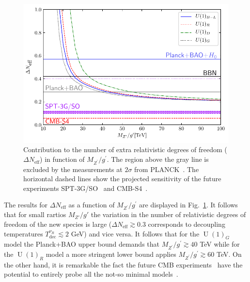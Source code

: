 \documentclass[12pt]{article}
\begin{document}
%
\begin{figure}[t]
\centering
\includegraphics[scale=1]{D_Neff.pdf}
\caption{Contribution to the number of extra relativistic degrees of freedom ($\Delta N_{\text{eff}}$) in function of $M_{Z^{\prime}}/g^{\prime}$. The region above the gray line is excluded by the measurements at $2\sigma$ from PLANCK~\cite{Aghanim:2018eyx}. The horizontal dashed lines show the projected sensitivity of the future experiments SPT-3G/SO~\cite{Benson:2014qhw} and CMB-S4~\cite{Abitbol:2019nhf}. }
\label{fig:Neff}
\end{figure}
%

The results for $\Delta N_{\text{eff}}$ as a function of $M_{Z^{\prime}}/g^{\prime}$ are displayed in Fig.~\ref{fig:Neff}. It follows that for small rartios $M_{Z'}/g'$  the variation in the number of relativistic degrees of freedom of the new species is large ($\Delta N_{\text{eff}}\gtrsim0.3$ corresponds to decoupling temperatures $T^{\nu_R}_{\text{dec}}\lesssim2$ GeV) and vice versa.
It follows that for the $\operatorname{U}(1)_{G}$ model the Planck+BAO upper bound demands that $M_{Z^{\prime}}/g^{\prime} \gtrsim 40$ TeV while for the $\operatorname{U}(1)_{R}$ model a more stringent lower bound applies $M_{Z^{\prime}}/g^{\prime} \gtrsim 60$ TeV. 
On the other hand, it is remarkable the fact the future CMB experiments~\cite{Benson:2014qhw,Abitbol:2019nhf} have the potential to entirely probe all the not-so minimal models~\cite{Abazajian:2019oqj}.  
\end{document}
